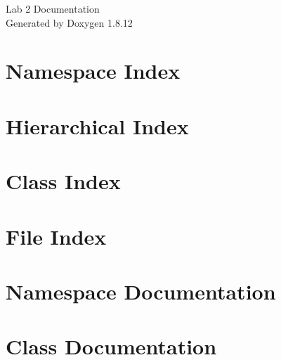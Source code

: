 \documentclass[twoside]{book}
\newcommand{\+}{\discretionary{\mbox{\scriptsize$\hookleftarrow$}}{}{}}
\newcommand{\clearemptydoublepage}{%
  \newpage{\pagestyle{empty}\cleardoublepage}%
}
\begin{document}
\hypersetup{pageanchor=false,
             bookmarksnumbered=true,
             pdfencoding=unicode
            }
\begin{titlepage}
\vspace*{7cm}
\begin{center}%
{\Large Lab 2 Documentation }\\
\vspace*{1cm}
{\large Generated by Doxygen 1.8.12}\\
\end{center}
\end{titlepage}
\clearemptydoublepage
{}
\tableofcontents
\clearemptydoublepage
{}
\hypersetup{pageanchor=true}

\chapter{Namespace Index}

\chapter{Hierarchical Index}

\chapter{Class Index}

\chapter{File Index}

\chapter{Namespace Documentation}

\chapter{Class Documentation}















\end{document}
